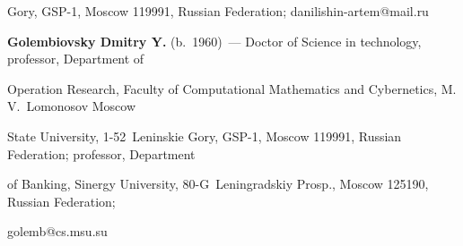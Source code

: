 Gory, GSP-1, Moscow 119991, Russian Federation; \mbox{danilishin-artem@mail.ru}





\vspace*{3pt}





\noindent


\textbf{Golembiovsky Dmitry Y.} (b.\ 1960)~--- Doctor of Science in technology, professor, Department of 


Operation Research, Faculty of Computational Mathematics and Cybernetics, M.\,V.~Lomonosov Moscow 


State University, 1-52~Leninskie Gory, GSP-1, Moscow 119991, Russian Federation; professor, Department 


of Banking, Sinergy University, 80-G~Leningradskiy Prosp., Moscow 125190, Russian Federation; 


\mbox{golemb@cs.msu.su}


\label{end\stat}





\renewcommand{\bibname}{\protect\rm Литература} 


      


 


